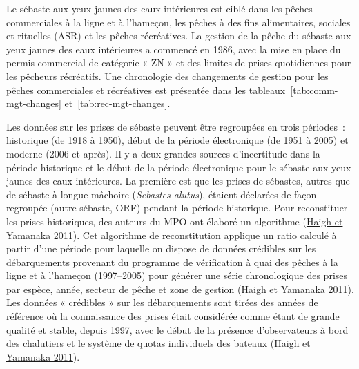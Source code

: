 \documentclass[french,11pt]{book}
\begin{document}
\clearpage

\label{app:catch-data}

Le sébaste aux yeux jaunes des eaux intérieures est ciblé dans les pêches commerciales à la ligne et à l'hameçon, les pêches à des fins alimentaires, sociales et rituelles (ASR) et les pêches récréatives. La gestion de la pêche du sébaste aux yeux jaunes des eaux intérieures a commencé en 1986, avec la mise en place du permis commercial de catégorie « ZN » et des limites de prises quotidiennes pour les pêcheurs récréatifs. Une chronologie des changements de gestion pour les pêches commerciales et récréatives est présentée dans les tableaux~\ref{tab:comm-mgt-changes} et~\ref{tab:rec-mgt-changes}.

\hypertarget{sec:com-catch-data}{%
\label{sec:com-catch-data}}

Les données sur les prises de sébaste peuvent être regroupées en trois périodes~: historique (de 1918 à 1950), début de la période électronique (de 1951 à 2005) et moderne (2006 et après). Il y a deux grandes sources d'incertitude dans la période historique et le début de la période électronique pour le sébaste aux yeux jaunes des eaux intérieures. La première est que les prises de sébastes, autres que de sébaste à longue mâchoire (\emph{Sebastes alutus}), étaient déclarées de façon regroupée (autre sébaste, ORF) pendant la période historique. Pour reconstituer les prises historiques, des auteurs du MPO ont élaboré un algorithme (\protect\hyperlink{ref-haigh2011}{Haigh et Yamanaka 2011}). Cet algorithme de reconstitution applique un ratio calculé à partir d'une période pour laquelle on dispose de données crédibles sur les débarquements provenant du programme de vérification à quai des pêches à la ligne et à l'hameçon (1997--2005) pour générer une série chronologique des prises par espèce, année, secteur de pêche et zone de gestion (\protect\hyperlink{ref-haigh2011}{Haigh et Yamanaka 2011}). Les données « crédibles » sur les débarquements sont tirées des années de référence où la connaissance des prises était considérée comme étant de grande qualité et stable, depuis 1997, avec le début de la présence d'observateurs à bord des chalutiers et le système de quotas individuels des bateaux (\protect\hyperlink{ref-haigh2011}{Haigh et Yamanaka 2011}).
\end{document}
